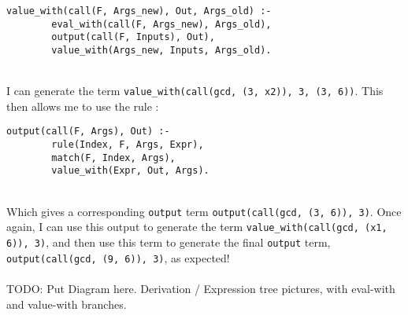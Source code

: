 \begin{lstlisting}
value_with(call(F, Args_new), Out, Args_old) :- 
		eval_with(call(F, Args_new), Args_old), 
		output(call(F, Inputs), Out), 
		value_with(Args_new, Inputs, Args_old).
\end{lstlisting}
\mbox{} \\
I can generate the term \lstinline{value_with(call(gcd, (3, x2)), 3, (3, 6))}. This then allows me to use the rule : \\%


\begin{lstlisting}
output(call(F, Args), Out) :- 
		rule(Index, F, Args, Expr), 
		match(F, Index, Args),
		value_with(Expr, Out, Args).
\end{lstlisting}
\mbox{} \\
Which gives a corresponding \lstinline{output} term \lstinline{output(call(gcd, (3, 6)), 3)}. Once again, I can use this output to generate the term \lstinline{value_with(call(gcd, (x1, 6)), 3)}, and then use this term to generate the final \lstinline{output} term, \lstinline{output(call(gcd, (9, 6)), 3)}, as expected! \\ \\%
TODO: Put Diagram here. Derivation / Expression tree pictures, with eval-with and value-with branches.

\pagebreak
%
%